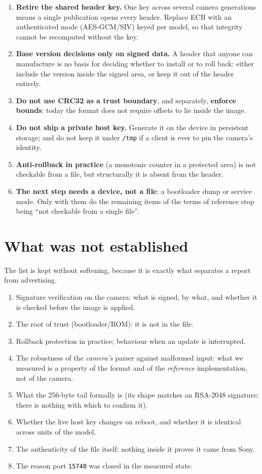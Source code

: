\documentclass[12pt]{article}
\newcommand{\code}[1]{\texttt{\small #1}}
\begin{document}
\begin{enumerate}
\item \textbf{Retire the shared header key.} One key across several camera generations means a
single publication opens every header. Replace ECB with an authenticated mode (AES-GCM/SIV)
keyed per model, so that integrity cannot be recomputed without the key.
\item \textbf{Base version decisions only on signed data.} A header that anyone can
manufacture is no basis for deciding whether to install or to roll back: either include the
version inside the signed area, or keep it out of the header entirely.
\item \textbf{Do not use CRC32 as a trust boundary}, and separately, \textbf{enforce bounds}:
today the format does not require offsets to lie inside the image.
\item \textbf{Do not ship a private host key.} Generate it on the device in persistent
storage; and do not keep it under \code{/tmp} if a client is ever to pin the camera's
identity.
\item \textbf{Anti-rollback in practice} (a monotonic counter in a protected area) is not
checkable from a file, but structurally it is absent from the header.
\item \textbf{The next step needs a device, not a file}: a bootloader dump or service mode.
Only with them do the remaining items of the terms of reference stop being ``not checkable
from a single file''.
\end{enumerate}

\section{What was not established}
\label{sec:unknown}

The list is kept without softening, because it is exactly what separates a report from
advertising.

\begin{enumerate}
\item Signature verification on the camera: what is signed, by what, and whether it is checked
before the image is applied.
\item The root of trust (bootloader/ROM): it is not in the file.
\item Rollback protection in practice; behaviour when an update is interrupted.
\item The robustness of the \emph{camera's} parser against malformed input: what we measured
is a property of the format and of the \emph{reference} implementation, not of the camera.
\item What the 256-byte tail formally is (its shape matches an RSA-2048 signature; there is
nothing with which to confirm it).
\item Whether the live host key changes on reboot, and whether it is identical across units
of the model.
\item The authenticity of the file itself: nothing inside it proves it came from Sony.
\item The reason port \code{15740} was closed in the measured state.
\end{enumerate}
\end{document}
